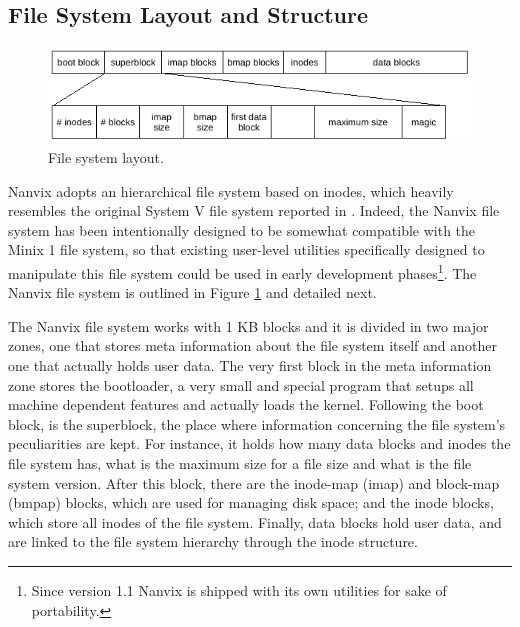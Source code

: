 \documentclass[10pt,a4paper]{article}
\begin{document}
\subsection{File System Layout and Structure}
\label{subsection: file system layout and structure}

\begin{figure}
	\centering
	\includegraphics[scale=1.05]{img/file-system-layout}
	\caption{File system layout.}
	\label{figure: file system layout}
\end{figure}

Nanvix adopts an hierarchical file system based on inodes, which heavily resembles the original System V file system reported in \cite{Bach:86}. Indeed, the Nanvix file system has been intentionally designed to be somewhat compatible with the Minix 1 file system, so that existing user-level utilities specifically designed to manipulate this file system could be used in early development phases\footnote{Since version 1.1 Nanvix is shipped with its own utilities for sake of portability.}. The Nanvix file system is outlined in Figure \ref{figure: file system layout} and detailed next.

The Nanvix file system works with 1 KB blocks and it is divided in two major zones, one that stores meta information about the file system itself and another one that actually holds user data. The very first block in the meta information zone stores the bootloader, a very small and special program that setups all machine dependent features and actually loads the kernel. Following the boot block, is the superblock, the place where information concerning the file system's peculiarities are kept. For instance, it holds how many data blocks and inodes the file system has, what is the maximum size for a file size and what is the file system version. After this block, there are the inode-map (imap) and block-map (bmpap) blocks, which are used for managing disk space; and the inode blocks, which store all inodes of the file system. Finally, data blocks hold user data, and are linked to the file system hierarchy through the inode structure.
\end{document}
